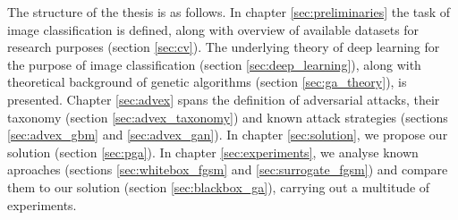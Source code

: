 The structure of the thesis is as follows. In chapter \ref{sec:preliminaries} the task of image classification is defined, along with overview of available datasets for research purposes (section \ref{sec:cv}). The underlying theory of deep learning for the purpose of image classification (section \ref{sec:deep_learning}), along with theoretical background of genetic algorithms (section \ref{sec:ga_theory}), is presented. Chapter \ref{sec:advex} spans the definition of adversarial attacks, their taxonomy (section \ref{sec:advex_taxonomy}) and known attack strategies (sections \ref{sec:advex_gbm} and \ref{sec:advex_gan}). In chapter \ref{sec:solution}, we propose our solution (section \ref{sec:pga}). In chapter \ref{sec:experiments}, we analyse known aproaches (sections \ref{sec:whitebox_fgsm} and \ref{sec:surrogate_fgsm}) and compare them to our solution (section \ref{sec:blackbox_ga}), carrying out a multitude of experiments.
